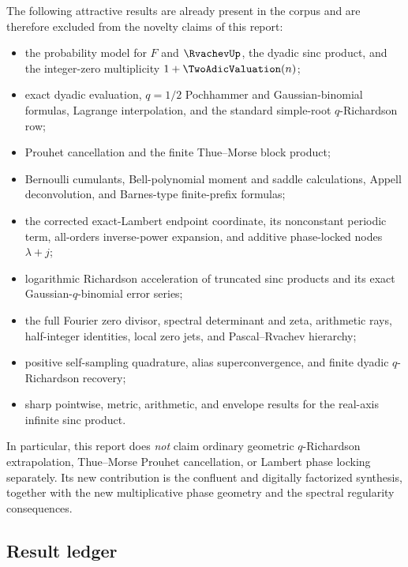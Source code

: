\documentclass[11pt]{article}
\numberwithin{equation}{section}
\theoremstyle{definition}
\theoremstyle{remark}
\begin{document}
The following attractive results are already present in the corpus and are therefore
excluded from the novelty claims of this report:
\begin{itemize}
\item the probability model for $F$ and $\RvachevUp$, the dyadic sinc product, and the integer-zero
      multiplicity $1+\TwoAdicValuation(n)$;
\item exact dyadic evaluation, $q=1/2$ Pochhammer and Gaussian-binomial formulas, Lagrange
      interpolation, and the standard simple-root $q$-Richardson row;
\item Prouhet cancellation and the finite Thue--Morse block product;
\item Bernoulli cumulants, Bell-polynomial moment and saddle calculations, Appell
      deconvolution, and Barnes-type finite-prefix formulas;
\item the corrected exact-Lambert endpoint coordinate, its nonconstant periodic term,
      all-orders inverse-power expansion, and additive phase-locked nodes $\lambda+j$;
\item logarithmic Richardson acceleration of truncated sinc products and its exact
      Gaussian-$q$-binomial error series;
\item the full Fourier zero divisor, spectral determinant and zeta, arithmetic rays,
      half-integer identities, local zero jets, and Pascal--Rvachev hierarchy;
\item positive self-sampling quadrature, alias superconvergence, and finite dyadic
      $q$-Richardson recovery;
\item sharp pointwise, metric, arithmetic, and envelope results for the real-axis infinite
      sinc product.
\end{itemize}

In particular, this report does \emph{not} claim ordinary geometric $q$-Richardson
extrapolation, Thue--Morse Prouhet cancellation, or Lambert phase locking separately.  Its
new contribution is the confluent and digitally factorized synthesis, together with the
new multiplicative phase geometry and the spectral regularity consequences.

\subsection{Result ledger}
\end{document}
